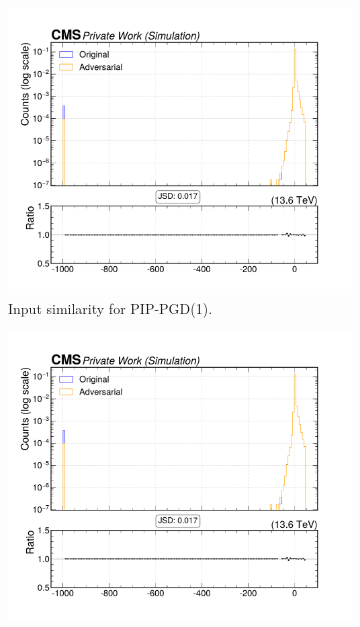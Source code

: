 \begin{figure}[htbp]
  \centering
  \begin{subfigure}[t]{0.32\textwidth}
    \includegraphics[width=\linewidth]{media/output/features/compare/combined_it_1/cmp_global_features_TagVarCSV_trackSip2dSigAboveCharm.pdf}
    \caption*{Input similarity for PIP-PGD(1).}
  \end{subfigure}\hfill
  \begin{subfigure}[t]{0.32\textwidth}
    \includegraphics[width=\linewidth]{media/output/features/compare/combined_it_2/cmp_global_features_TagVarCSV_trackSip2dSigAboveCharm.pdf}

\end{subfigure}
\end{figure}
